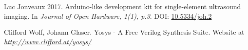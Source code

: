\documentclass{article}
\begin{document}
  


\begin{thebibliography}{1}

Luc Jonveaux 2017.
\newblock  Arduino-like development kit for single-element ultrasound imaging. 
\newblock In {\em  Journal of Open Hardware, 1(1), p.3}. DOI: \href{http://doi.org/10.5334/joh.2}{10.5334/joh.2}

Clifford Wolf, Johann Glaser.
\newblock  Yosys - A Free Verilog Synthesis Suite. 
\newblock Website at {\em\href{http://www.clifford.at/yosys/}{http://www.clifford.at/yosys/} }


\end{thebibliography}
\end{document}
